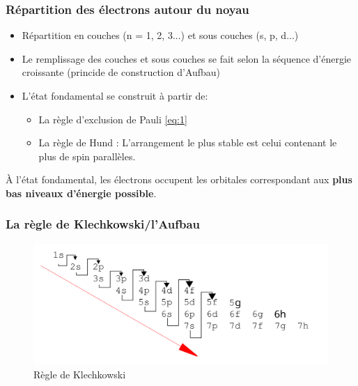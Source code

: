 \documentclass[10pt,a4paper]{book}
\begin{document}
\subsubsection{Répartition des électrons autour du noyau}
\begin{itemize}
\item Répartition en couches (n = 1, 2, 3...) et sous couches (s, p, d...)
\item Le remplissage des couches et sous couches se fait selon la séquence d'énergie croissante (princide de construction d'Aufbau)
\item L'état fondamental se construit à partir de:
\begin{itemize}
	\item La règle d'exclusion de Pauli \ref{eq:1}
	\item La règle de Hund : L'arrangement le plus stable est celui contenant le plus de spin parallèles.
\end{itemize}
\end{itemize}
\par À l'état fondamental, les électrons occupent les orbitales correspondant aux \textbf{plus bas niveaux d'énergie possible}.
\subsubsection{La règle de Klechkowski/l'Aufbau}
\begin{figure}[h!]
\begin{center}
\includegraphics[scale=0.15]{./assets/klechkowski_rule.png}
\caption{Règle de Klechkowski}
\label{fig:klechkowski}
\end{center}
\end{figure}
\end{document}

